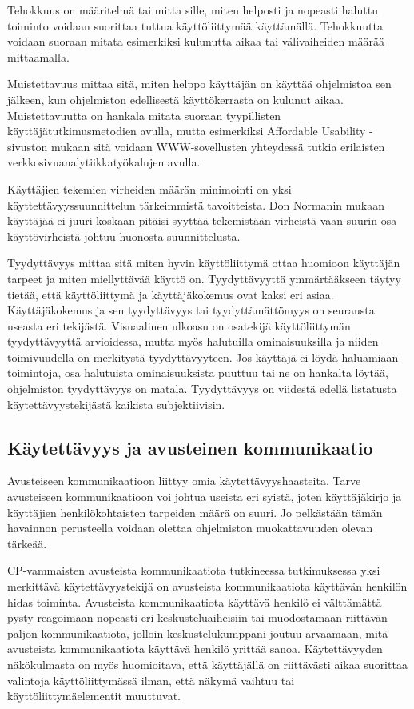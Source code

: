 \documentclass[utf8]{gradu3}
\begin{document}
Tehokkuus on määritelmä tai mitta sille, miten helposti ja nopeasti haluttu toiminto voidaan suorittaa tuttua käyttöliittymää käyttämällä. Tehokkuutta voidaan suoraan mitata esimerkiksi kulunutta aikaa tai välivaiheiden määrää mittaamalla. 

Muistettavuus mittaa sitä, miten helppo käyttäjän on käyttää ohjelmistoa sen jälkeen, kun ohjelmiston edellisestä käyttökerrasta on kulunut aikaa. Muistettavuutta on hankala mitata suoraan tyypillisten käyttäjätutkimusmetodien avulla, mutta esimerkiksi Affordable Usability -sivuston \parencite[]{affordable-usability} mukaan sitä voidaan WWW-sovellusten yhteydessä tutkia erilaisten verkkosivuanalytiikkatyökalujen avulla.

Käyttäjien tekemien virheiden määrän minimointi on yksi käyttettävyyssuunnittelun tärkeimmistä tavoitteista. Don Normanin \parencite[]{norman-doet} mukaan  käyttäjää ei juuri koskaan pitäisi syyttää tekemistään virheistä vaan suurin osa käyttövirheistä johtuu huonosta suunnittelusta.

Tyydyttävyys mittaa sitä miten hyvin käyttöliittymä ottaa huomioon käyttäjän tarpeet ja miten miellyttävää käyttö on. Tyydyttävyyttä ymmärtääkseen täytyy tietää, että käyttöliittymä ja käyttäjäkokemus ovat kaksi eri asiaa. Käyttäjäkokemus ja sen tyydyttävyys tai tyydyttämättömyys on seurausta useasta eri tekijästä. Visuaalinen ulkoasu on osatekijä käyttöliittymän tyydyttävyyttä arvioidessa, mutta myös halutuilla ominaisuuksilla ja niiden toimivuudella on merkitystä tyydyttävyyteen. Jos käyttäjä ei löydä haluamiaan toimintoja, osa halutuista ominaisuuksista puuttuu tai ne on hankalta löytää, ohjelmiston tyydyttävyys on matala. Tyydyttävyys on viidestä edellä listatusta käytettävyystekijästä kaikista subjektiivisin.

\subsection{Käytettävyys ja avusteinen kommunikaatio}

Avusteiseen kommunikaatioon liittyy omia käytettävyyshaasteita. Tarve avusteiseen kommunikaatioon voi johtua useista eri syistä, joten käyttäjäkirjo ja käyttäjien henkilökohtaisten tarpeiden määrä on suuri. Jo pelkästään tämän havainnon perusteella voidaan olettaa ohjelmiston muokattavuuden olevan tärkeää.

CP-vammaisten avusteista kommunikaatiota tutkineessa tutkimuksessa \parencite[]{classmate-aac-study} yksi merkittävä käytettävyystekijä on avusteista kommunikaatiota käyttävän henkilön hidas toiminta. Avusteista kommunikaatiota käyttävä henkilö ei välttämättä pysty reagoimaan nopeasti eri keskusteluaiheisiin tai muodostamaan riittävän paljon kommunikaatiota, jolloin keskustelukumppani joutuu arvaamaan, mitä avusteista kommunikaatiota käyttävä henkilö yrittää sanoa. Käytettävyyden näkökulmasta on myös huomioitava, että käyttäjällä on riittävästi aikaa suorittaa valintoja käyttöliittymässä ilman, että näkymä vaihtuu tai käyttöliittymäelementit muuttuvat.
\end{document}
